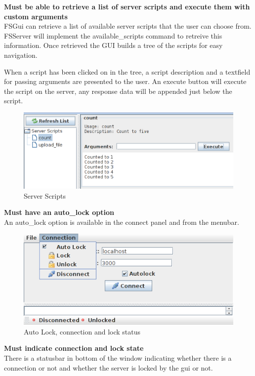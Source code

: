 \textbf{Must be able to retrieve a list of server scripts and execute them with custom arguments} \\
FSGui can retrieve a list of available server scripts that the user can choose from. FSServer will implement the available\_scripts command to retreive this information. Once retrieved the GUI builds a tree of the scripts for easy navigation.

When a script has been clicked on in the tree, a script description and a textfield for passing arguments are presented to the user. An execute button will execute the script on the server, any response data will be appended just below the script.

\begin{figure}[h!] \centering
	\includegraphics[scale=0.7]{img/fsgui_server}
  \caption{Server Scripts}
\end{figure}

\textbf{Must have an auto\_lock option} \\
An auto\_lock option is available in the connect panel and from the menubar.

\begin{figure}[h!] \centering
	\includegraphics[scale=0.5]{img/fsgui_autolock}
  \caption{Auto Lock, connection and lock status}
\end{figure}

\textbf{Must indicate connection and lock state} \\
There is a statusbar in bottom of the window indicating whether there is a connection or not and whether the server is locked by the gui or not.


